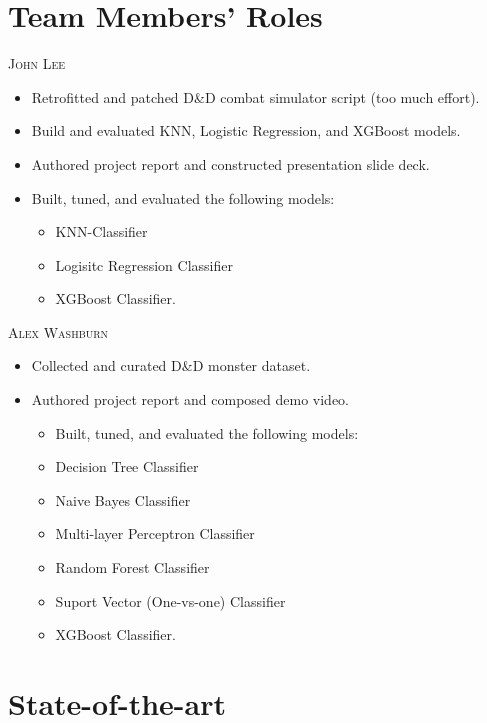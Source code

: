 \documentclass[12pt]{diazessay}
\begin{document}
\section{Team Members' Roles}


{\large\scshape John Lee}

\begin{itemize}
	\item Retrofitted and patched D\&D combat simulator script (too much effort).
	\item Build and evaluated KNN, Logistic Regression, and XGBoost models.
	\item Authored project report and constructed presentation slide deck.
	\item Built, tuned, and evaluated the following models:
	\begin{itemize}
		\item KNN-Classifier
		\item Logisitc Regression Classifier
		\item XGBoost Classifier.
	\end{itemize}
\end{itemize}
\vspace*{1em}

{\large\scshape Alex Washburn}

\begin{itemize}
	\item Collected and curated D\&D monster dataset.
	\item Authored project report and composed demo video.
	\begin{itemize}
	\item Built, tuned, and evaluated the following models:
		\item Decision Tree Classifier
		\item Naive Bayes Classifier
		\item Multi-layer Perceptron Classifier
		\item Random Forest Classifier
		\item Suport Vector (One-vs-one) Classifier
		\item XGBoost Classifier.
	\end{itemize}
\end{itemize}


\section{State-of-the-art}
\end{document}
